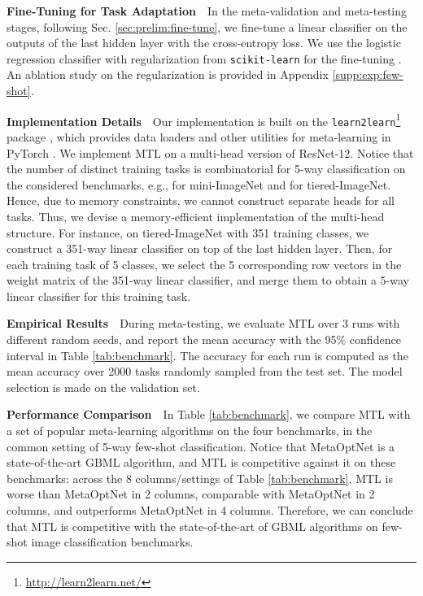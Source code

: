 \documentclass{article}
\begin{document}
\textbf{Fine-Tuning for Task Adaptation}~~In the meta-validation and meta-testing stages, following Sec. \ref{sec:prelim:fine-tune}, we fine-tune a linear classifier on the outputs of the last hidden layer with the cross-entropy loss. We use the logistic regression classifier with  regularization from \texttt{scikit-learn} for the fine-tuning \citep{sklearn}. An ablation study on the  regularization is provided in Appendix \ref{supp:exp:few-shot}.



\textbf{Implementation Details}~~Our implementation is built on the \texttt{learn2learn}\footnote{ \url{http://learn2learn.net/}} package \cite{learn2learn2019}, which provides data loaders and other utilities for meta-learning in PyTorch \cite{pytorch}. We implement MTL on a multi-head version of ResNet-12. Notice that the number of distinct training tasks is combinatorial for 5-way classification on the considered benchmarks, e.g.,  for mini-ImageNet and  for tiered-ImageNet. Hence, due to memory constraints, we cannot construct separate heads for all tasks. Thus, we devise a memory-efficient implementation of the multi-head structure. For instance, on tiered-ImageNet with  351 training classes, we construct a 351-way linear classifier on top of the last hidden layer. Then, for each training task of 5 classes, we select the 5 corresponding row vectors in the weight matrix of the 351-way linear classifier, and merge them to obtain a 5-way linear classifier for this training task.

\textbf{Empirical Results}~~During meta-testing, we evaluate MTL over 3 runs with different random seeds, and report the mean accuracy with the 95\% confidence interval in Table \ref{tab:benchmark}. The accuracy for each run is computed as the mean accuracy over 2000 tasks randomly sampled from the test set. The model selection is made on the validation set.

\textbf{Performance Comparison}~~In Table \ref{tab:benchmark}, we compare MTL with a set of popular meta-learning algorithms on the four benchmarks, in the common setting of 5-way few-shot classification. Notice that MetaOptNet is a state-of-the-art GBML algorithm, and MTL is competitive against it on these benchmarks: across the 8 columns/settings of Table \ref{tab:benchmark}, MTL is worse than MetaOptNet in 2 columns, comparable with MetaOptNet in 2 columns, and outperforms MetaOptNet in 4 columns. Therefore, we can conclude that MTL is competitive with the state-of-the-art of GBML algorithms on few-shot image classification benchmarks.
\end{document}
